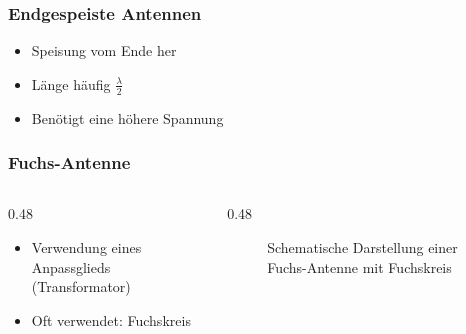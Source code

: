 \begin{frame}
    \frametitle{Endgespeiste Antennen}
    \begin{itemize}
        \item Speisung vom Ende her
        \item Länge häufig $\frac{\lambda}{2}$
        \item Benötigt eine höhere Spannung
    \end{itemize}
\end{frame}

\begin{frame}
    \frametitle{Fuchs-Antenne}
    \begin{columns}
        \begin{column}{0.48\textwidth}
            \begin{itemize}
                \item Verwendung eines Anpassglieds (Transformator)
                \item Oft verwendet: Fuchskreis
            \end{itemize}

        \end{column}
        \begin{column}{0.48\textwidth}

            \begin{figure}
                \caption{\scriptsize Schematische Darstellung einer Fuchs-Antenne mit Fuchskreis}
                \label{e_antennenformen_fuchskreis}
            \end{figure}


        \end{column}
    \end{columns}

\end{frame}

\begin{frame}
\end{frame}

